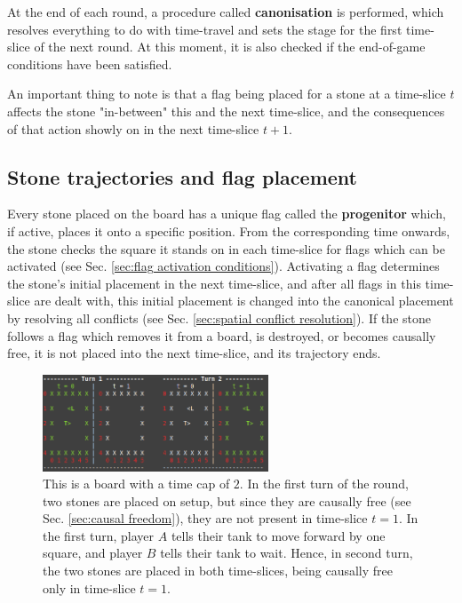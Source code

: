 \documentclass[12pt]{article}
\begin{document}
	At the end of each round, a procedure called \textbf{canonisation} is performed, which resolves everything to do with time-travel and sets the stage for the first time-slice of the next round. At this moment, it is also checked if the end-of-game conditions have been satisfied.
	
	An important thing to note is that a flag being placed for a stone at a time-slice $t$ affects the stone "in-between" this and the next time-slice, and the consequences of that action showly on in the next time-slice $t+1$.
	
	\subsection{Stone trajectories and flag placement}\label{sec:trajectories}
	Every stone placed on the board has a unique flag called the \textbf{progenitor} which, if active, places it onto a specific position. From the corresponding time onwards, the stone checks the square it stands on in each time-slice for flags which can be activated (see Sec. \ref{sec:flag activation conditions}). Activating a flag determines the stone's initial placement in the next time-slice, and after all flags in this time-slice are dealt with, this initial placement is changed into the canonical placement by resolving all conflicts (see Sec. \ref{sec:spatial conflict resolution}). If the stone follows a flag which removes it from a board, is destroyed, or becomes causally free, it is not placed into the next time-slice, and its trajectory ends.
	
	\begin{figure}[h]
\begin{center}

    \includegraphics[width=0.6\textwidth]{images/diag_placing_flags}
 \caption{This is a board with a time cap of $2$. In the first turn of the round, two stones are placed on setup, but since they are causally free (see Sec. \ref{sec:causal freedom}), they are not present in time-slice $t=1$. In the first turn, player $A$ tells their tank to move forward by one square, and player $B$ tells their tank to wait. Hence, in second turn, the two stones are placed in both time-slices, being causally free only in time-slice $t=1$.}\label{fig:placing flags}
\end{center}
\end{figure}
\end{document}
